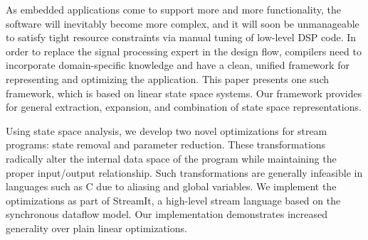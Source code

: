 \label{sec:conclusion}

As embedded applications come to support more and more functionality,
the software will inevitably become more complex, and it will soon be
unmanageable to satisfy tight resource constraints via manual tuning
of low-level DSP code.  In order to replace the signal processing
expert in the design flow, compilers need to incorporate
domain-specific knowledge and have a clean, unified framework for
representing and optimizing the application.  This paper presents one
such framework, which is based on linear state space systems.  Our
framework provides for general extraction, expansion, and combination
of state space representations.

Using state space analysis, we develop two novel optimizations for
stream programs: state removal and parameter reduction.  These
transformations radically alter the internal data space of the program
while maintaining the proper input/output relationship.  Such
transformations are generally infeasible in languages such as C due to
aliasing and global variables.  We implement the optimizations as part
of StreamIt, a high-level stream language based on the synchronous
dataflow model.  Our implementation demonstrates increased generality
over plain linear optimizations.




